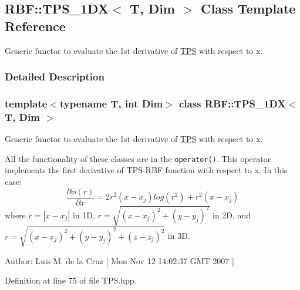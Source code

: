 \hypertarget{classRBF_1_1TPS__1DX}{
\subsection{RBF::TPS\_\-1DX$<$ T, Dim $>$ Class Template Reference}
\label{classRBF_1_1TPS__1DX}
}
Generic functor to evaluate the 1st derivative of \hyperlink{classRBF_1_1TPS}{TPS} with respect to x.  




\subsubsection{Detailed Description}
\subsubsection*{template$<$typename T, int Dim$>$ class RBF::TPS\_\-1DX$<$ T, Dim $>$}

Generic functor to evaluate the 1st derivative of \hyperlink{classRBF_1_1TPS}{TPS} with respect to x. 

All the functionality of these classes are in the {\tt operator()}. This operator implements the first derivative of TPS-RBF function with respect to x. In this case: \[ \frac{\partial \phi(r)}{\partial x} = 2 r^2(x - x_j)log(r^2) + r^2(x - x_j) \] where $ r = |x - x_j| $ in 1D, $ r = \sqrt{(x - x_j)^2 + (y - y_j)^2} $ in 2D, and $ r = \sqrt{(x - x_j)^2 + (y - y_j)^2 + (z - z_j)^2} $ in 3D.

\begin{Desc}
\item[Author:]Luis M. de la Cruz \mbox{[} Mon Nov 12 14:02:37 GMT 2007 \mbox{]} \end{Desc}


Definition at line 75 of file TPS.hpp.